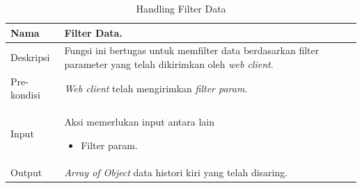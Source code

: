 \begin{table}[H]
    \centering
       \caption{Handling Filter Data}
    \begin{tabular}{|p{3cm}|p{10cm}|}
    \hline
        Nama & Filter Data.\\
    \hline
    \hline
        Deskripsi & Fungsi ini bertugas untuk memfilter data berdasarkan filter parameter yang telah dikirimkan oleh \textit{web client}.
        \\
    \hline
        Pre-kondisi &\textit{Web client} telah mengirimkan \textit{filter param}.\\
    \hline
        Input & 
        Aksi memerlukan input antara lain 
        \begin{itemize}
            \item Filter param.
        \end{itemize}
       \\
       \hline
        Output & 
        \textit{Array of Object} data histori kiri yang telah disaring.
       \\
    \hline
    \end{tabular}
\end{table}


